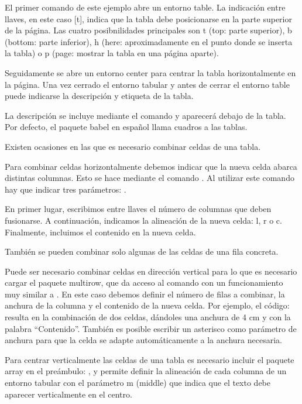 \documentclass[11pt, a4paper]{article}
\begin{document}
El primer comando de este ejemplo abre un entorno table. La indicación entre llaves, en este caso [t], indica que la tabla debe posicionarse en la parte superior de la página. Las cuatro posibnilidades principales son t (top: parte superior), b (bottom: parte inferior), h (here: aproximadamente en el punto donde se inserta la tabla) o p (page: mostrar la tabla en una página aparte).

Seguidamente se abre un entorno center para centrar la tabla horizontalmente en la página. Una vez cerrado el entorno tabular y antes de cerrar el entorno table puede indicarse la descripción y etiqueta de la tabla.

La descripción se incluye mediante el comando  y aparecerá debajo de la tabla. Por defecto, el paquete babel en español llama cuadros a las tablas. 

Existen ocasiones en las que es necesario combinar celdas de una tabla.

Para combinar celdas horizontalmente debemos indicar que la nueva celda abarca distintas columnas. Esto se hace mediante el comando . Al utilizar este comando hay que indicar tres parámetros: .

En primer lugar, escribimos entre llaves el número de columnas que deben fusionarse. A continuación, indicamos la alineación de la nueva celda: l, r o c. Finalmente, incluimos el contenido en la nueva celda.

También se pueden combinar solo algunas de las celdas de una fila concreta.

Puede ser necesario combinar celdas en dirección vertical para lo que es necesario cargar el paquete multirow, que da acceso al comando  con un funcionamiento muy similar a . En este caso debemos definir el número de filas a combinar, la anchura de la columna y el contenido de la nueva celda. Por ejemplo, el código:  resulta en la combinación de dos celdas, dándoles una anchura de 4 cm y con la palabra “Contenido”. También es posible escribir un asterisco como parámetro de anchura para que la celda se adapte automáticamente a la anchura necesaria.

Para centrar verticalmente las celdas de una tabla es necesario incluir el paquete array en el preámbulo: , y permite definir la alineación de cada columna de un entorno tabular con el parámetro m (middle) que indica que el texto debe aparecer verticalmente en el centro.
\end{document}
